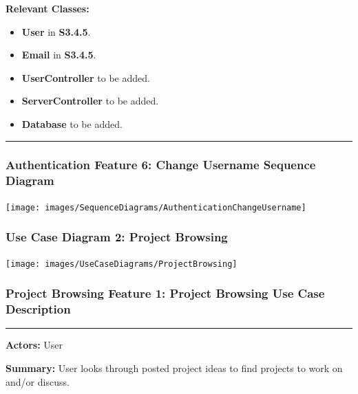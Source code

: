 \documentclass[twoside,letterpaper]{article}
\begin{document}
\noindent\textbf{Relevant Classes:}
\begin{itemize}
	\item \textbf{User} in \textbf{S3.4.5}.
	\item \textbf{Email} in \textbf{S3.4.5}.
	\item \textbf{UserController} to be added.
	\item \textbf{ServerController} to be added.
	\item \textbf{Database} to be added.
\end{itemize}
\vspace{8pt}
\hrule
\newpage

\subsubsection[Authentication Feature 6: Change Username Sequence Diagram]{\rmfamily\bfseries\color{black}
	Authentication Feature 6: Change Username Sequence Diagram}
\hypertarget{RefHeading22059017292}{}

\bigskip

\texttt{[image: images/SequenceDiagrams/AuthenticationChangeUsername]}

\newpage

\subsubsection[Use Case Diagram 2: Project Browsing]{\rmfamily\bfseries\color{black}
Use Case Diagram 2: Project Browsing}

\texttt{[image: images/UseCaseDiagrams/ProjectBrowsing]}

\newpage

\subsubsection[Project Browsing Feature 1: Project Browsing Use Case Description]{\rmfamily\bfseries\color{black}
Project Browsing Feature 1: Project Browsing Use Case Description}
\hypertarget{RefHeading22059017292}{}

\vspace{2pt}
\hrule
\vspace{8pt}
\textbf{Actors:} User \newline

\noindent\textbf{Summary:} User looks through posted project ideas to find projects to work on and/or discuss. \newline
\end{document}
